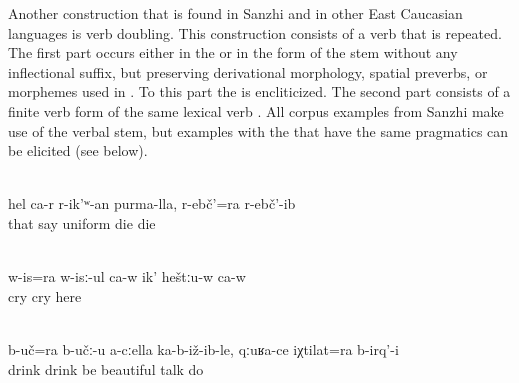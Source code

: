 Another construction that is found in Sanzhi and in other East Caucasian languages is verb doubling. This construction consists of a verb that is repeated. The first part occurs either in the  or in the form of the stem without any inflectional suffix, but preserving derivational morphology, spatial preverbs, or morphemes used in . To this part the   is encliticized. The second part consists of a finite verb form of the same lexical verb . All corpus examples from Sanzhi make use of the verbal stem, but examples with the  that have the same pragmatics can be elicited (see below).
%
\begin{exe}
	\\\label{ex:‎She herself said it in that manner}%
	\gll	hel	ca-r	r-ik'ʷ-an	purma-lla,	r-ebč'=ra	r-ebč'-ib\\
		that		say	uniform	\tsc{f-}die	die\\
	\glt	{}

	\\\label{ex:‎And as for crying, he is crying a lot here}%
	\gll	w-is=ra	w-isː-ul	ca-w	ik'	heštːu-w	ca-w\\
		cry	cry			here	\\
	\glt	{}

	\\\label{ex:As for drinking, they sit and drink with you, and (we) had nice conversations}%
	\gll	b-uč=ra	b-učː-u	a-cːella	ka-b-iž-ib-le, qːuʁa-ce	iχtilat=ra b-irq'-i\\
		drink	drink		be beautiful	talk	do\\
	\glt	{}
\end{exe}


